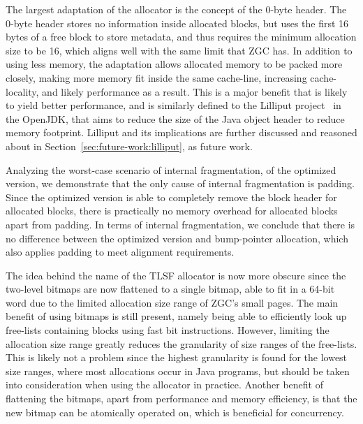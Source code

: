 The largest adaptation of the allocator is the concept of the 0-byte header. The 0-byte header stores no information inside allocated blocks, but uses the first 16 bytes of a free block to store metadata, and thus requires the minimum allocation size to be 16, which aligns well with the same limit that ZGC has. In addition to using less memory, the adaptation allows allocated memory to be packed more closely, making more memory fit inside the same cache-line, increasing cache-locality, and likely performance as a result. This is a major benefit that is likely to yield better performance, and is similarly defined to the Lilliput project~\cite{lilliput} in the OpenJDK, that aims to reduce the size of the Java object header to reduce memory footprint. Lilliput and its implications are further discussed and reasoned about in Section~\ref{sec:future-work:lilliput}, as future work.

\newpage

Analyzing the worst-case scenario of internal fragmentation, of the optimized version, we demonstrate that the only cause of internal fragmentation is padding. Since the optimized version is able to completely remove the block header for allocated blocks, there is practically no memory overhead for allocated blocks apart from padding. In terms of internal fragmentation, we conclude that there is no difference between the optimized version and bump-pointer allocation, which also applies padding to meet alignment requirements.

The idea behind the name of the TLSF allocator is now more obscure since the two-level bitmaps are now flattened to a single bitmap, able to fit in a 64-bit word due to the limited allocation size range of ZGC's small pages. The main benefit of using bitmaps is still present, namely being able to efficiently look up free-lists containing blocks using fast bit instructions. However, limiting the allocation size range greatly reduces the granularity of size ranges of the free-lists. This is likely not a problem since the highest granularity is found for the lowest size ranges, where most allocations occur in Java programs, but should be taken into consideration when using the allocator in practice. Another benefit of flattening the bitmaps, apart from performance and memory efficiency, is that the new bitmap can be atomically operated on, which is beneficial for concurrency.


